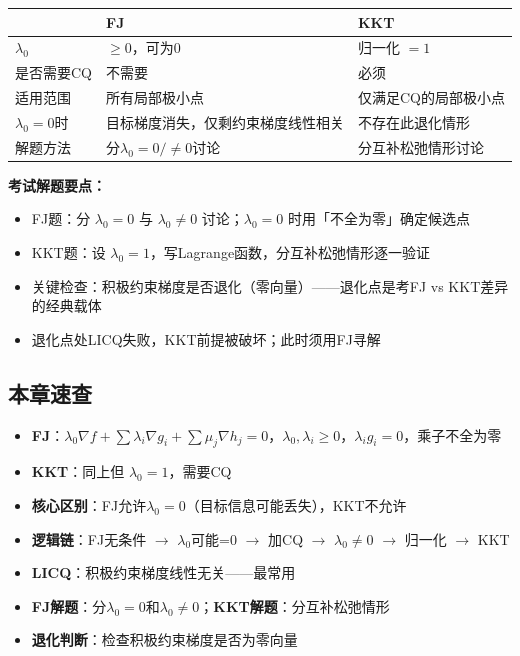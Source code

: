 \begin{tabular}{@{}p{16mm}@{}p{33mm}@{}p{33mm}@{}}
\toprule
& \textbf{FJ} & \textbf{KKT} \\
\midrule
$\lambda_0$ & $\ge0$，可为0 & 归一化 $=1$ \\
\midrule
是否需要CQ & 不需要 & 必须 \\
\midrule
适用范围 & 所有局部极小点 & 仅满足CQ的局部极小点 \\
\midrule
$\lambda_0=0$时 & 目标梯度消失，仅剩约束梯度线性相关 & 不存在此退化情形 \\
\midrule
解题方法 & 分$\lambda_0=0/\neq0$讨论 & 分互补松弛情形讨论 \\
\bottomrule
\end{tabular}

\medskip
\textbf{考试解题要点：}
\begin{itemize}
  \item FJ题：分 $\lambda_0=0$ 与 $\lambda_0\neq0$ 讨论；$\lambda_0=0$ 时用「不全为零」确定候选点
  \item KKT题：设 $\lambda_0=1$，写Lagrange函数，分互补松弛情形逐一验证
  \item 关键检查：积极约束梯度是否退化（零向量）——退化点是考FJ vs KKT差异的经典载体
  \item 退化点处LICQ失败，KKT前提被破坏；此时须用FJ寻解
\end{itemize}

\subsection{本章速查}

\begin{itemize}
  \item \textbf{FJ}：$\lambda_0\nabla f + \sum\lambda_i\nabla g_i + \sum\mu_j\nabla h_j = 0$，$\lambda_0,\lambda_i\ge0$，$\lambda_i g_i=0$，乘子不全为零
  \item \textbf{KKT}：同上但 $\lambda_0=1$，需要CQ
  \item \textbf{核心区别}：FJ允许$\lambda_0=0$（目标信息可能丢失），KKT不允许
  \item \textbf{逻辑链}：FJ无条件 $\to$ $\lambda_0$可能=0 $\to$ 加CQ $\to$ $\lambda_0\neq0$ $\to$ 归一化 $\to$ KKT
  \item \textbf{LICQ}：积极约束梯度线性无关——最常用
  \item \textbf{FJ解题}：分$\lambda_0=0$和$\lambda_0\neq0$；\textbf{KKT解题}：分互补松弛情形
  \item \textbf{退化判断}：检查积极约束梯度是否为零向量
\end{itemize}
